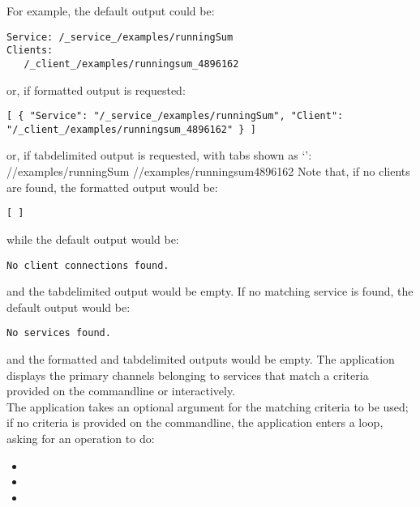 For example, the default output could be:
\outputBegin
\begin{verbatim}
Service: /_service_/examples/runningSum
Clients:
   /_client_/examples/runningsum_4896162
\end{verbatim}
\outputEnd{}
or, if \json\longDash{}formatted output is requested:
\outputBegin
\begin{verbatim}
[ { "Service": "/_service_/examples/runningSum", "Client":
"/_client_/examples/runningsum_4896162" } ]
\end{verbatim}
\outputEnd
\condPage{}
or, if tab\longDash{}delimited output is requested, with tabs shown as `\tabSymbol':
\outputBegin{}
/\serviceName/examples/runningSum\pseudotab{}%
/\clientName/examples/runningsum\textunderscore{}4896162
\outputEnd{}
Note that, if no clients are found, the \json\longDash{}formatted output would be:
\outputBegin
\begin{verbatim}
[ ]
\end{verbatim}
\outputEnd{}
while the default output would be:
\outputBegin
\begin{verbatim}
No client connections found.
\end{verbatim}
\outputEnd{}
and the tab\longDash{}delimited output would be empty.
If no matching service is found, the default output would be:
\outputBegin
\begin{verbatim}
No services found.
\end{verbatim}
\outputEnd{}
and the \json\longDash{}formatted and tab\longDash{}delimited outputs would be empty.
The application  displays the primary channels belonging to
services that match a criteria provided on the command\longDash{}line or interactively.\\

The application takes an optional argument for the matching criteria to be used; if no
criteria is provided on the command\longDash{}line, the application enters a loop, asking
for an operation to do:
\begin{itemize}
\item{}
\item\exSp{}
\item\exSp{}
\end{itemize}

\insertFullUtilityParameters\\

